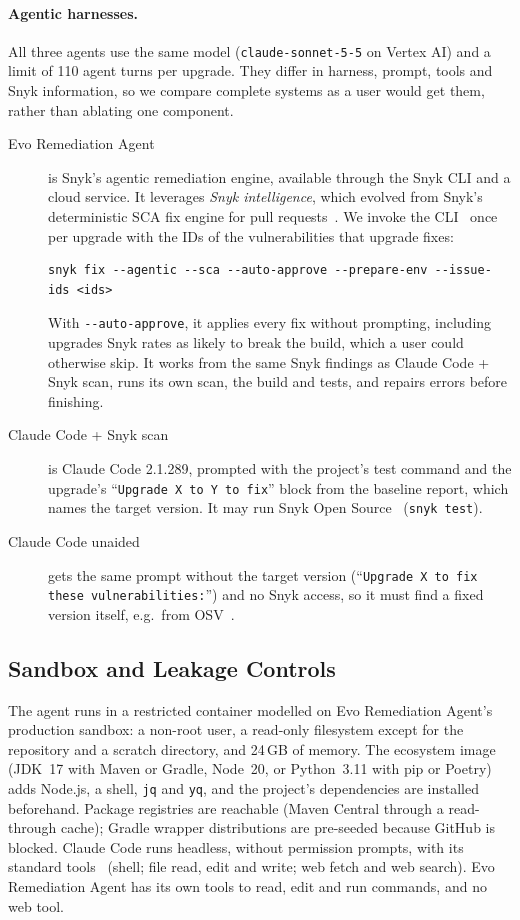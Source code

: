 \documentclass[11pt]{article}
\theoremstyle{definition}
\newcommand{\evo}{Evo Remediation Agent}
\newcommand{\aided}{Claude Code + Snyk scan}
\newcommand{\unaided}{Claude Code unaided}
\begin{document}
\paragraph{Agentic harnesses.} All three agents use the same model (\texttt{claude-sonnet-5-5} on Vertex AI) and a limit of 110 agent turns per upgrade. They differ in harness, prompt, tools and Snyk information, so we compare complete systems as a user would get them, rather than ablating one component.
\begin{description}
  \item[\evo{}] is Snyk's agentic remediation engine, available through the Snyk CLI and a cloud service. It leverages \emph{Snyk intelligence}, which evolved from Snyk's deterministic SCA fix engine for pull requests~\cite{snykfixdocs}. We invoke the CLI~\cite{snykcli} once per upgrade with the IDs of the vulnerabilities that upgrade fixes:
\begin{lstlisting}
snyk fix --agentic --sca --auto-approve --prepare-env --issue-ids <ids>
\end{lstlisting}
With \texttt{-{}-auto-approve}, it applies every fix without prompting, including upgrades Snyk rates as likely to break the build, which a user could otherwise skip. It works from the same Snyk findings as \aided{}, runs its own scan, the build and tests, and repairs errors before finishing.
  \item[\aided{}] is Claude Code 2.1.289, prompted with the project's test command and the upgrade's ``\texttt{Upgrade X to Y to fix}'' block from the baseline report, which names the target version. It may run Snyk Open Source~\cite{snykopensource} (\texttt{snyk test}).
  \item[\unaided{}] gets the same prompt without the target version (``\texttt{Upgrade X to fix these vulnerabilities:}'') and no Snyk access, so it must find a fixed version itself, e.g.\ from OSV~\cite{osv}.
\end{description}

\subsection{Sandbox and Leakage Controls}
\label{sec:sandbox}

The agent runs in a restricted container modelled on \evo{}'s production sandbox: a non-root user, a read-only filesystem except for the repository and a scratch directory, and 24\,GB of memory. The ecosystem image (JDK~17 with Maven or Gradle, Node~20, or Python~3.11 with pip or Poetry) adds Node.js, a shell, \texttt{jq} and \texttt{yq}, and the project's dependencies are installed beforehand. Package registries are reachable (Maven Central through a read-through cache); Gradle wrapper distributions are pre-seeded because GitHub is blocked. Claude Code runs headless, without permission prompts, with its standard tools~\cite{claudecodetools} (shell; file read, edit and write; web fetch and web search). \evo{} has its own tools to read, edit and run commands, and no web tool.
\end{document}

